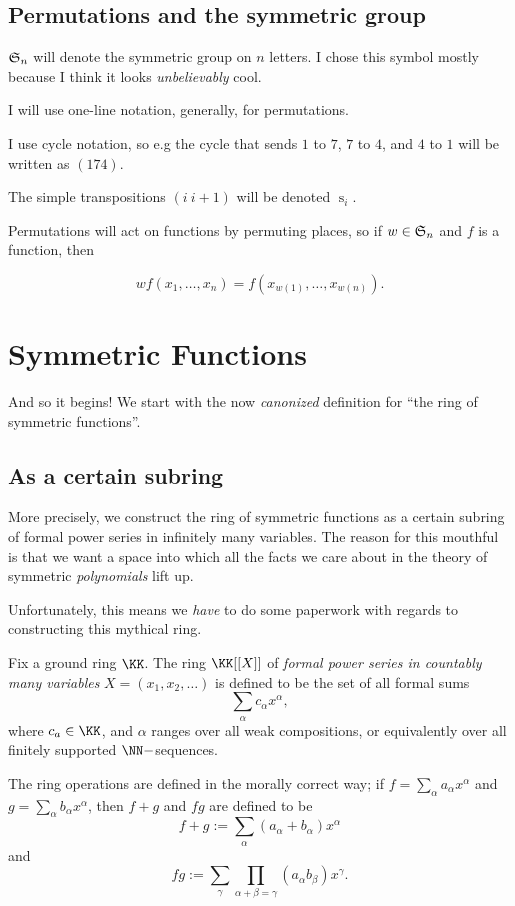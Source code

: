 \documentclass{article}
\DeclareMathOperator{\s}{s}
\newcommand{\frkS}{\ensuremath\mathfrak{S}}
\begin{document}
\subsection*{Permutations and the symmetric group}

$\frkS_n$ will denote the symmetric group on $n$ letters. I chose this symbol mostly because I think it looks \textit{\color{red} unbelievably} cool.

I will use one-line notation, generally, for permutations.

I use cycle notation, so e.g the cycle that sends $1$ to $7$, $7$ to $4$, and $4$ to $1$ will be written as $(174)$.

The simple transpositions $(i\:i+1)$ will be denoted $\s_i$.

Permutations will act on functions by permuting places, so if $w \in \frkS_n$ and $f$ is a function, then

\[
    wf(x_1,\ldots,x_n) = f(x_{w(1)},\ldots,x_{w(n)}).
\]

\section{Symmetric Functions}

And so it begins! We start with the now \textit{canonized} definition for ``the ring of symmetric functions''.

\subsection{As a certain subring}

More precisely, we construct the ring of symmetric functions as a certain subring of formal power series in infinitely many variables.
The reason for this mouthful is that we want a space into which all the facts we care about in the theory of symmetric \textit{polynomials} lift up.

Unfortunately, this means we \textit{have} to do some paperwork with regards to constructing this mythical ring.
\begin{definition}
    Fix a ground ring $\KK$.
    The ring $\KK[[X]]$ of \textit{formal power series in countably many variables} $X = (x_1, x_2, \ldots)$ is defined to be the set of all formal sums
    \[
        \sum_\alpha c_\alpha x^\alpha,
    \]
    where $c_a \in \KK$, and $\alpha$ ranges over all weak compositions, or equivalently over all finitely supported $\NN-$sequences.

    The ring operations are defined in the morally correct way;
    if $f = \sum_\alpha a_\alpha x^\alpha$ and $g = \sum_\alpha b_\alpha x^\alpha$, then $f + g$ and $fg$ are defined to be
    \[
        f+g := \sum_\alpha (a_\alpha+b_\alpha)x^\alpha
    \]
    and
    \[
        fg := \sum_\gamma \prod_{\alpha+\beta=\gamma} (a_\alpha b_\beta) x^\gamma.
    \]
\end{definition}
\end{document}
